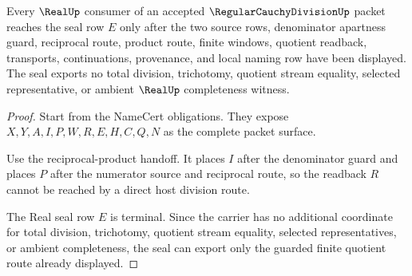 \begin{theorem}
\label{thm:regular-cauchy-division-real-seal-nonescape}
Every $\RealUp$ consumer of an accepted $\RegularCauchyDivisionUp$ packet reaches the seal row $E$ only after the two source rows, denominator apartness guard, reciprocal route, product route, finite windows, quotient readback, transports, continuations, provenance, and local naming row have been displayed. The seal exports no total division, trichotomy, quotient stream equality, selected representative, or ambient $\RealUp$ completeness witness.
\end{theorem}
\begin{proof}
Start from the NameCert obligations. They expose $X,Y,A,I,P,W,R,E,H,C,Q,N$ as the complete packet surface.

Use the reciprocal-product handoff. It places $I$ after the denominator guard and places $P$ after the numerator source and reciprocal route, so the readback $R$ cannot be reached by a direct host division route.

The Real seal row $E$ is terminal. Since the carrier has no additional coordinate for total division, trichotomy, quotient stream equality, selected representatives, or ambient completeness, the seal can export only the guarded finite quotient route already displayed.
\end{proof}


\begin{closurestatus}{\RegularCauchyDivisionUp}
  \theoryclosure{\seedClosure}
  \formalstatus{\theoremCheckedV}
\end{closurestatus}
